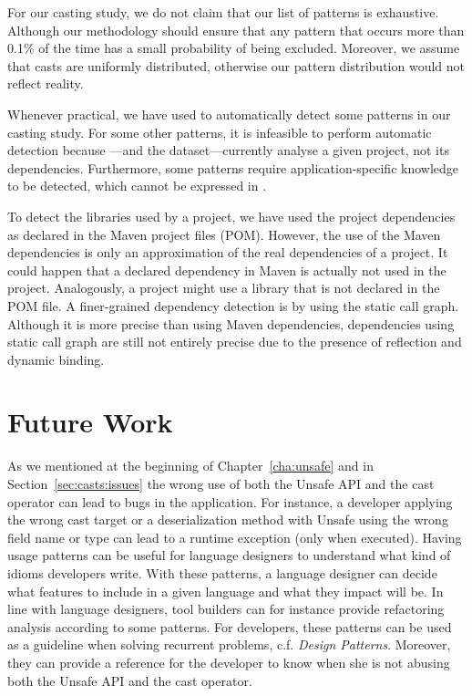 For our casting study,
we do not claim that our list of patterns is exhaustive.
Although our methodology should ensure that any pattern that occurs more
than 0.1\% of the time has a small probability of being excluded.
Moreover, we assume that casts are uniformly distributed,
otherwise our pattern distribution would not reflect reality.

Whenever practical,
we have used \ql{} to automatically detect some patterns in our casting study.
For some other patterns, it is infeasible to perform automatic detection because \ql{}---and the \lgtm{} dataset---currently analyse a given project,
not its dependencies.
Furthermore, some patterns require application-specific knowledge to be detected,
which cannot be expressed in \ql{}.

To detect the libraries used by a project,
we have used the project dependencies as declared in the Maven project
files (POM).
However, the use of the Maven dependencies is only an approximation of
the real dependencies of a project.
It could happen that a declared dependency in Maven is actually not
used in the project.
Analogously, a project might use a library that is not declared in the POM file.
A finer-grained dependency detection is by using the static call graph.
Although it is more precise than using Maven dependencies,
dependencies using static call graph are still not entirely precise
due to the presence of reflection and dynamic binding.


\section{Future Work}

As we mentioned at the beginning of Chapter~\ref{cha:unsafe} and in Section~\ref{sec:casts:issues} the wrong use of both the Unsafe API and the cast operator can lead to bugs in the application.
For instance, a developer applying the wrong cast target or a deserialization method with Unsafe using the wrong field name or type
can lead to a runtime exception (only when executed).
Having usage patterns can be useful for language designers to understand what kind of idioms developers write.
With these patterns, a language designer can decide what features to include in a given language and what they impact will be.
In line with language designers, tool builders can for instance provide refactoring analysis according to some patterns.
For developers, these patterns can be used as a guideline when solving recurrent problems, c.f. \emph{Design Patterns}.
Moreover, they can provide a reference for the developer to know when she is not abusing both the Unsafe API and the cast operator.

